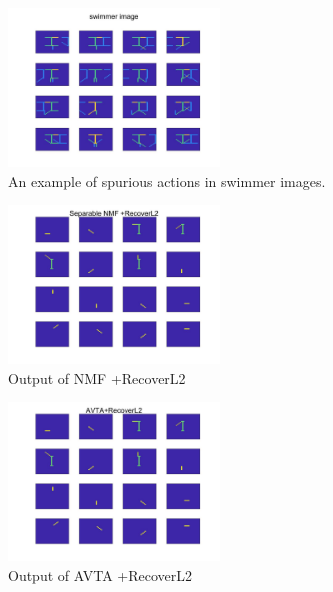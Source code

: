\documentclass[]{article}
\begin{document}
	\begin{figure}[!h]
		\centering
		\includegraphics[width=0.5\textwidth]{swimmer_datasets.jpg}
		\caption{An example of spurious actions in swimmer images.}
		\label{fig:Swimmer}
	\end{figure}%
	\begin{figure}[!h]
		\centering
		\includegraphics[width=0.5\textwidth]{swimmer_NMF.jpg}
		\caption{Output of {NMF +RecoverL2}}
		\label{fig:NMF swim}
	\end{figure}%
	\begin{figure}[!h]
		\centering
		\includegraphics[width=0.5\textwidth]{swimmer_avta.jpg}
		\caption{Output of {AVTA +RecoverL2}}
		\label{fig:AVTA swim}
	\end{figure}

\newpage


\end{document}
